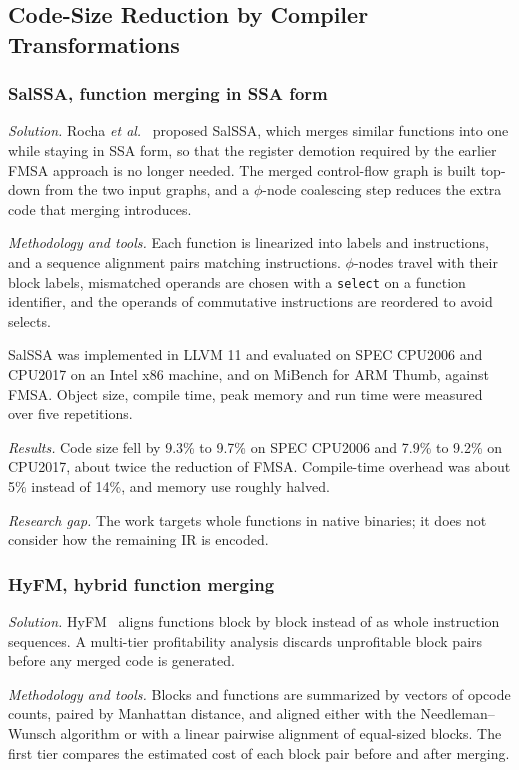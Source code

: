 \documentclass{ieeeaccess}
\begin{document}
\subsection{Code-Size Reduction by Compiler Transformations}

\subsubsection{SalSSA, function merging in SSA form}
\textit{Solution.} Rocha \textit{et al.}~\cite{rocha2020salssa} proposed SalSSA, which merges similar functions into one while staying in SSA form, so that the register demotion required by the earlier FMSA approach is no longer needed. The merged control-flow graph is built top-down from the two input graphs, and a $\phi$-node coalescing step reduces the extra code that merging introduces.

\textit{Methodology and tools.} Each function is linearized into labels and instructions, and a sequence alignment pairs matching instructions. $\phi$-nodes travel with their block labels, mismatched operands are chosen with a \texttt{select} on a function identifier, and the operands of commutative instructions are reordered to avoid selects.

SalSSA was implemented in LLVM 11 and evaluated on SPEC CPU2006 and CPU2017 on an Intel x86 machine, and on MiBench for ARM Thumb, against FMSA. Object size, compile time, peak memory and run time were measured over five repetitions.

\textit{Results.} Code size fell by 9.3\% to 9.7\% on SPEC CPU2006 and 7.9\% to 9.2\% on CPU2017, about twice the reduction of FMSA. Compile-time overhead was about 5\% instead of 14\%, and memory use roughly halved.

\textit{Research gap.} The work targets whole functions in native binaries; it does not consider how the remaining IR is encoded.

\subsubsection{HyFM, hybrid function merging}
\textit{Solution.} HyFM~\cite{rocha2021hyfm} aligns functions block by block instead of as whole instruction sequences. A multi-tier profitability analysis discards unprofitable block pairs before any merged code is generated.

\textit{Methodology and tools.} Blocks and functions are summarized by vectors of opcode counts, paired by Manhattan distance, and aligned either with the Needleman--Wunsch algorithm or with a linear pairwise alignment of equal-sized blocks. The first tier compares the estimated cost of each block pair before and after merging.
\end{document}
